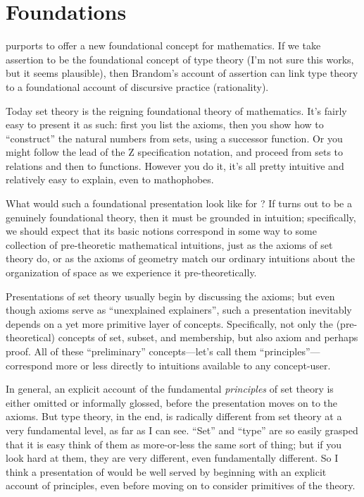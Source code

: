 \section{Foundations}
\label{sect:foundations}

\HoTT{} purports to offer a new foundational concept for mathematics.  If
we take assertion to be the foundational concept of type theory (I'm
not sure this works, but it seems plausible), then Brandom's account
of assertion can link type theory to a foundational account of
discursive practice (rationality).

Today set theory is the reigning foundational theory of mathematics.
It's fairly easy to present it as such: first you list the axioms,
then you show how to ``construct'' the natural numbers from sets,
using a successor function.  Or you might follow the lead of the Z
specification notation, and proceed from
sets to relations and then to functions.  However you do it, it's all
pretty intuitive and relatively easy to explain, even to mathophobes.

What would such a foundational presentation look like for \HoTT{}?  If
\HoTT{} turns out to be a genuinely foundational theory, then it must be
grounded in intuition; specifically, we should expect that its basic
notions correspond in some way to some collection of pre-theoretic
mathematical intuitions, just as the axioms of set theory do, or as
the axioms of geometry match our ordinary intuitions about the
organization of space as we experience it pre-theoretically.

Presentations of set theory usually begin by discussing the axioms;
but even though axioms serve as ``unexplained explainers'', such a
presentation inevitably depends on a yet more primitive layer of
concepts.  Specifically, not only the (pre-theoretical) concepts of
set, subset, and membership, but also axiom and perhaps proof.  All of
these ``preliminary'' concepts---let's call them
``principles''---correspond more or less directly to intuitions
available to any concept-user.

In general, an explicit account of the fundamental \textit{principles}
of set theory is either omitted or informally glossed, before the
presentation moves on to the axioms.  But type theory, in the end, is
radically different from set theory at a very fundamental level, as
far as I can see.  ``Set'' and ``type'' are so easily grasped that it
is easy think of them as more-or-less the same sort of thing; but if
you look hard at them, they are very different, even fundamentally
different.  So I think a presentation of \HoTT{} would be well served by
beginning with an explicit account of principles, even before moving
on to consider primitives of the theory.

